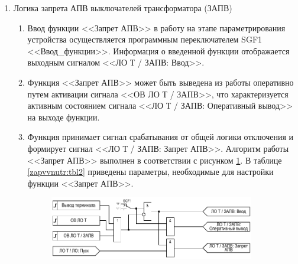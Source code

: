 \documentclass[a4paper, 12pt,table, hidelinks, DIV=calc]{extarticle} %
\begin{document}
\begin{enumerate}[label=\arabic{section}.\arabic{subsection}.\arabic{enumi}, labelsep=4pt, leftmargin=0pt, itemindent=57pt, itemsep=0pt, parsep=5pt]
\begin{enumerate}[label=\arabic{section}.\arabic{subsection}.\arabic{enumi}.\arabic*, labelsep=4pt, leftmargin=0em, itemindent=65pt, parsep=0pt]
\end{enumerate}
\FloatBarrier %

\item Логика запрета АПВ выключателей трансформатора (ЗАПВ)

\begin{enumerate}[label=\arabic{section}.\arabic{subsection}.\arabic{enumi}.\arabic*, labelsep=4pt, leftmargin=0em, itemindent=65pt, parsep=0pt]

\item
Ввод функции <<Запрет АПВ>> в работу на этапе параметрирования устройства  осуществляется программным переключателем SGF1 <<Ввод\_функции>>. Информация о введенной функции отображается выходным сигналом <<ЛО Т / ЗАПВ: Ввод>>.
\item
Функция <<Запрет АПВ>> может быть выведена из работы оперативно путем активации сигнала <<ОВ ЛО Т / ЗАПВ>>, что характеризуется активным состоянием сигнала <<ЛО Т / ЗАПВ: Оперативный вывод>> на выходе функции.
\item
Функция принимает сигнал срабатывания от общей логики отключения и формирует сигнал <<ЛО Т / ЗАПВ: Запрет АПВ>>. 
Алгоритм работы <<Запрет АПВ>> выполнен в соответствии с рисунком \ref{zapvvnutr:img2}. В таблице \ref{zapvvnutr:tbl2} приведены параметры, необходимые для настройки функции <<Запрет АПВ>>.

\begin{figure}[!h]
\centering
\includegraphics[width=0.9\textwidth,height=0.9\textheight,keepaspectratio]{img30.pdf}
\label{zapvvnutr:img2}
\end{figure}


\end{enumerate}
\end{enumerate}
\end{document}
